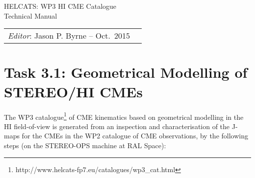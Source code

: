 \documentclass[12pt, a4paper, oneside]{article}
\begin{document}








\begin{center}
{\sc \Large HELCATS: WP3 HI CME Catalogue\\ Technical Manual}
\end{center}

 
\begin{center}
\begin{tabular}{ll}
\textit{Editor}: Jason P. Byrne -- Oct.~2015
\end{tabular}
\end{center}
 



\section*{\sc Task 3.1: Geometrical Modelling of STEREO/HI CMEs}

The WP3 catalogue\footnote{http://www.helcats-fp7.eu/catalogues/wp3\_cat.html} of CME kinematics based on geometrical modelling in the HI field-of-view is generated from an inspection and characterisation of the J-maps for the CMEs in the WP2 catalogue of CME observations, by the following steps (on the STEREO-OPS machine at RAL Space):
\end{document}

